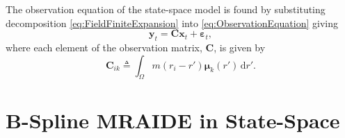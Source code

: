 \documentclass[review,authoryear,3p]{elsarticle}
\begin{document}

The observation equation of the state-space model is found by substituting decomposition \eqref{eq:FieldFiniteExpansion}
 into \eqref{eq:ObservationEquation} giving
\begin{equation}\label{eq:ReducedObservationEquation} 
	\mathbf{y}_t = \mathbf{C}\mathbf{x}_t + \boldsymbol{\varepsilon}_t,
\end{equation}
where each element of the observation matrix, $\mathbf{C}$, is given by
\begin{equation}\label{eq:Observationmatrix}
	\mathbf{C}_{ik} \triangleq \int_{\Omega}m(r_i -r')\boldsymbol{\mu}_k(r') \, \mathrm{d}r'.
\end{equation}

\section{B-Spline MRAIDE in State-Space }
\end{document}
